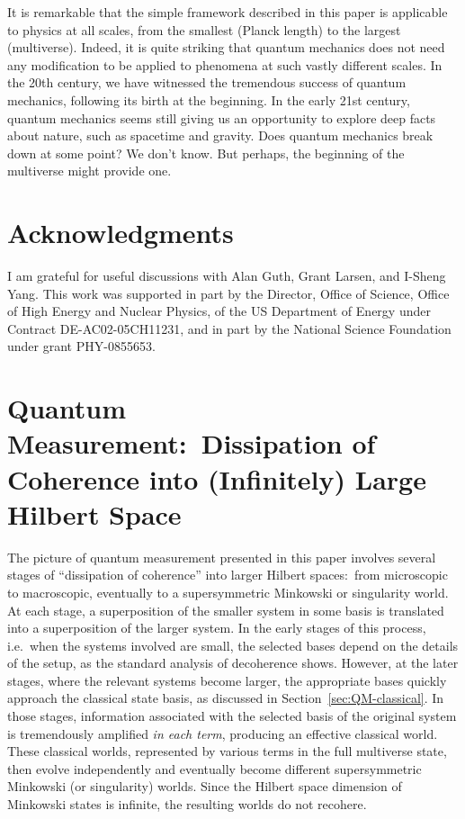 \documentclass[12pt]{article}
\begin{document}
It is remarkable that the simple framework described in this paper 
is applicable to physics at all scales, from the smallest (Planck length) 
to the largest (multiverse).  Indeed, it is quite striking that quantum 
mechanics does not need any modification to be applied to phenomena at 
such vastly different scales.  In the 20th century, we have witnessed 
the tremendous success of quantum mechanics, following its birth at the 
beginning.  In the early 21st century, quantum mechanics seems still 
giving us an opportunity to explore deep facts about nature, such as 
spacetime and gravity.  Does quantum mechanics break down at some point? 
We don't know.  But perhaps, the beginning of the multiverse might 
provide one.


\section*{Acknowledgments}

I am grateful for useful discussions with Alan Guth, Grant Larsen, and 
I-Sheng Yang.  This work was supported in part by the Director, Office 
of Science, Office of High Energy and Nuclear Physics, of the US Department 
of Energy under Contract DE-AC02-05CH11231, and in part by the National 
Science Foundation under grant PHY-0855653.


\appendix


\section{Quantum Measurement:\ Dissipation of Coherence into 
 (Infinitely) Large Hilbert Space}
\label{app:dynamics}

The picture of quantum measurement presented in this paper involves 
several stages of ``dissipation of coherence'' into larger Hilbert 
spaces:\ from microscopic to macroscopic, eventually to a supersymmetric 
Minkowski or singularity world.  At each stage, a superposition of the 
smaller system in some basis is translated into a superposition of the 
larger system.  In the early stages of this process, i.e.\ when the 
systems involved are small, the selected bases depend on the details 
of the setup, as the standard analysis of decoherence shows.  However, 
at the later stages, where the relevant systems become larger, the 
appropriate bases quickly approach the classical state basis, as 
discussed in Section~\ref{sec:QM-classical}.  In those stages, information 
associated with the selected basis of the original system is tremendously 
amplified {\it in each term}, producing an effective classical world. 
These classical worlds, represented by various terms in the full 
multiverse state, then evolve independently and eventually become 
different supersymmetric Minkowski (or singularity) worlds.  Since the 
Hilbert space dimension of Minkowski states is infinite, the resulting 
worlds do not recohere.
\end{document}
